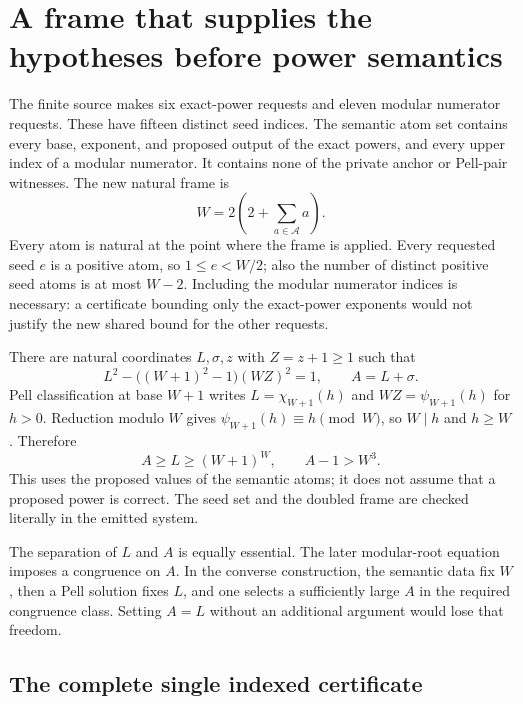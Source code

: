 \documentclass[11pt]{article}
\theoremstyle{remark}\newtheorem{remark}[theorem]{Remark}
\begin{document}


\section{A frame that supplies the hypotheses before power semantics}
\label{sec:frame}

The finite source makes six exact-power requests and eleven modular numerator requests. These have fifteen distinct seed indices. The semantic atom set contains every base, exponent, and proposed output of the exact powers, and every upper index of a modular numerator. It contains none of the private anchor or Pell-pair witnesses. The new natural frame is
\begin{equation}\label{eq:frameW}
 W=2\left(2+\sum_{a\in\mathcal A}a\right).
\end{equation}
Every atom is natural at the point where the frame is applied. Every requested seed $e$ is a positive atom, so $1\le e<W/2$; also the number of distinct positive seed atoms is at most $W-2$. Including the modular numerator indices is necessary: a certificate bounding only the exact-power exponents would not justify the new shared bound for the other requests.

There are natural coordinates $L,\sigma,z$ with $Z=z+1\ge1$ such that
\begin{equation}\label{eq:frameL}
 L^2-\bigl((W+1)^2-1\bigr)(WZ)^2=1,
 \qquad A=L+\sigma.
\end{equation}
Pell classification at base $W+1$ writes $L=\chi_{W+1}(h)$ and $WZ=\psi_{W+1}(h)$ for $h>0$. Reduction modulo $W$ gives $\psi_{W+1}(h)\equiv h\pmod W$, so $W\mid h$ and $h\ge W$. Therefore
\begin{equation}\label{eq:framebound}
 A\ge L\ge(W+1)^W,\qquad A-1>W^3.
\end{equation}
This uses the proposed values of the semantic atoms; it does not assume that a proposed power is correct. The seed set and the doubled frame are checked literally in the emitted system.

The separation of $L$ and $A$ is equally essential. The later modular-root equation imposes a congruence on $A$. In the converse construction, the semantic data fix $W$, then a Pell solution fixes $L$, and one selects a sufficiently large $A$ in the required congruence class. Setting $A=L$ without an additional argument would lose that freedom.

\subsection{The complete single indexed certificate}
\end{document}
